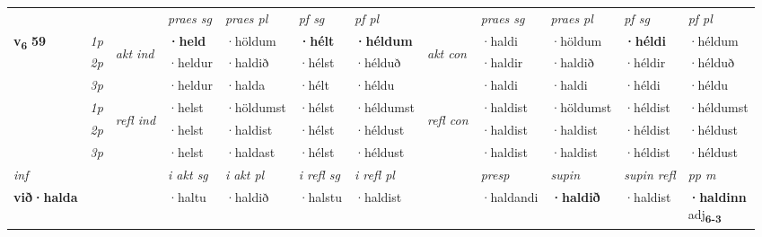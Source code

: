 \begin{longtable}[l]{X>{\footnotesize\itshape}llXXXXlXXXX}
\midrule

 & &   & \textit{praes sg}  & \textit{praes pl}    & \textit{ pf sg} & \textit{pf pl} & & \textit{praes sg}  & \textit{praes pl}    & \textit{pf sg} & \textit{pf pl }  \\ \cmidrule{4-7} \cmidrule{9-12}
 \multirow{2}{*}{{{\textbf{v{\textsubscript{6}}} \Large{\textbf{59}}}}}  & 1p & \multirow{3}{*}{\begin{turn}{90}\textit{akt ind}\end{turn}} & \textbf{·held} & ·höldum & \textbf{·hélt} & \textbf{·héldum} & \multirow{3}{*}{\begin{turn}{90}\textit{akt con}\end{turn}} &·haldi & ·höldum & \textbf{·héldi} & ·héldum\\*
 & 2p &  &  ·heldur  & ·haldið & ·hélst & ·hélduð & & ·haldir & ·haldið & ·héldir & ·hélduð \\*
 & 3p &  & ·heldur & ·halda & ·hélt & ·héldu & & ·haldi & ·haldi& ·héldi & ·héldu \\*
\cmidrule{4-7} \cmidrule{9-12}
 & 1p & \multirow{3}{*}{\begin{turn}{90}\textit{refl ind}\end{turn}}  & ·helst & ·höldumst & ·hélst & ·héldumst & \multirow{3}{*}{\begin{turn}{90}\textit{refl con}\end{turn}}  &·haldist & ·höldumst & ·héldist & ·héldumst \\*
 & 2p &  & ·helst & ·haldist & ·hélst & ·héldust & &·haldist & ·haldist & ·héldist & ·héldust \\*
 & 3p  & & ·helst & ·haldast & ·hélst & ·héldust & & ·haldist & ·haldist& ·héldist & ·héldust \\*
\cmidrule{4-7} \cmidrule{9-12}

   {\textit{inf}} & &  & \textit{i akt sg} & \textit{i akt pl} & \textit{i refl sg} & \textit{i refl pl} && \textit{presp} & \textit{supin} & \textit{supin refl} & \textit{pp m} \\*
  {\textbf{við\allowbreak ·halda}} & && ·haltu  & ·haldið & ·halstu & ·haldist && ·haldandi &  \textbf{·haldið} & ·haldist & \specialcell{\textbf{·haldinn} \\ adj\textbf{\textsubscript{6-3}}} \\*

\midrule


\end{longtable}

